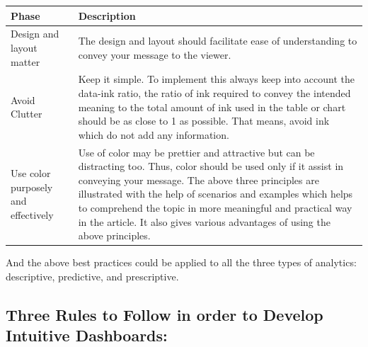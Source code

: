 \documentclass[]{book}
\theoremstyle{definition}
\theoremstyle{definition}
\theoremstyle{definition}
\theoremstyle{remark}
\begin{document}
\begin{longtable}[]{@{}ll@{}}
\toprule
\begin{minipage}[b]{0.16\columnwidth}\raggedright\strut
\textbf{Phase}\strut
\end{minipage} & \begin{minipage}[b]{0.78\columnwidth}\raggedright\strut
\textbf{Description}\strut
\end{minipage}\tabularnewline
\midrule
\endhead
\begin{minipage}[t]{0.16\columnwidth}\raggedright\strut
Design and layout matter\strut
\end{minipage} & \begin{minipage}[t]{0.78\columnwidth}\raggedright\strut
The design and layout should facilitate ease of understanding to convey
your message to the viewer.\strut
\end{minipage}\tabularnewline
\begin{minipage}[t]{0.16\columnwidth}\raggedright\strut
Avoid Clutter\strut
\end{minipage} & \begin{minipage}[t]{0.78\columnwidth}\raggedright\strut
Keep it simple. To implement this always keep into account the data-ink
ratio, the ratio of ink required to convey the intended meaning to the
total amount of ink used in the table or chart should be as close to 1
as possible. That means, avoid ink which do not add any
information.\strut
\end{minipage}\tabularnewline
\begin{minipage}[t]{0.16\columnwidth}\raggedright\strut
Use color purposely and effectively\strut
\end{minipage} & \begin{minipage}[t]{0.78\columnwidth}\raggedright\strut
Use of color may be prettier and attractive but can be distracting too.
Thus, color should be used only if it assist in conveying your message.
The above three principles are illustrated with the help of scenarios
and examples which helps to comprehend the topic in more meaningful and
practical way in the article. It also gives various advantages of using
the above principles.\strut
\end{minipage}\tabularnewline
\bottomrule
\end{longtable}

And the above best practices could be applied to all the three types of
analytics: descriptive, predictive, and prescriptive.

\subsection{Three Rules to Follow in order to Develop Intuitive
Dashboards:}\label{three-rules-to-follow-in-order-to-develop-intuitive-dashboards}
\end{document}
